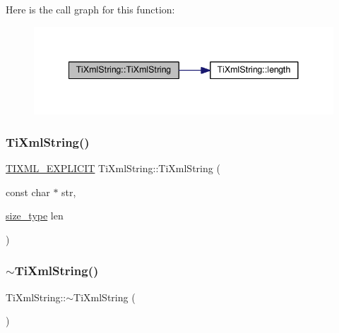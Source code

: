 Here is the call graph for this function\+:
\nopagebreak
\begin{figure}[H]
\begin{center}
\leavevmode
\includegraphics[width=341pt]{class_ti_xml_string_aa3b32bd2891a757c9f36c21db44c81d2_cgraph}
\end{center}
\end{figure}
\mbox{\label{class_ti_xml_string_a4b17ea5c5db986f14827223dfa8f1547}} 
\subsubsection{\texorpdfstring{Ti\+Xml\+String()}{TiXmlString()}\hspace{0.1cm}{\footnotesize\ttfamily [4/4]}}
{\footnotesize\ttfamily \hyperlink{tinystr_8h_ae341476cd6b94ee32e3e93110a759581}{T\+I\+X\+M\+L\+\_\+\+E\+X\+P\+L\+I\+C\+IT} Ti\+Xml\+String\+::\+Ti\+Xml\+String (\begin{DoxyParamCaption}\item[{const char $\ast$}]{str,  }\item[{\hyperlink{class_ti_xml_string_abeb2c1893a04c17904f7c06546d0b971}{size\+\_\+type}}]{len }\end{DoxyParamCaption})\hspace{0.3cm}{\ttfamily [inline]}}

\mbox{\label{class_ti_xml_string_a7ac03f581ca3422c4808162ab14f3450}} 
\subsubsection{\texorpdfstring{$\sim$\+Ti\+Xml\+String()}{~TiXmlString()}}
{\footnotesize\ttfamily Ti\+Xml\+String\+::$\sim$\+Ti\+Xml\+String (\begin{DoxyParamCaption}{ }\end{DoxyParamCaption})\hspace{0.3cm}{\ttfamily [inline]}}



